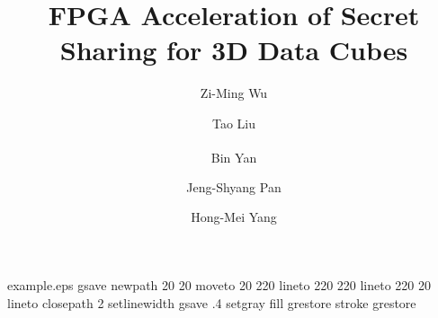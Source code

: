 %
%
%
%
%
\begin{filecontents*}{example.eps}
gsave
newpath
  20 20 moveto
  20 220 lineto
  220 220 lineto
  220 20 lineto
closepath
2 setlinewidth
gsave
  .4 setgray fill
grestore
stroke
grestore
\end{filecontents*}
%
\RequirePackage{fix-cm}
%
\documentclass[twocolumn]{svjour3}          %
%
\smartqed  %
%
\usepackage{multirow}
\usepackage{color}
\usepackage{graphicx}
\usepackage{amsmath}
\usepackage{enumerate}
\usepackage{subfigure}
\usepackage{booktabs}
\usepackage{float}
\usepackage{graphicx}
\usepackage[colorlinks=true,allcolors=blue]{hyperref}
\usepackage{marvosym}
\usepackage{hyperref}

%
%
%
%
%


\title{FPGA Acceleration of Secret Sharing for 3D Data Cubes%
}


\author{Zi-Ming Wu \and Tao Liu \and Bin Yan\textsuperscript{\Letter} \and Jeng-Shyang Pan \and Hong-Mei Yang
}

